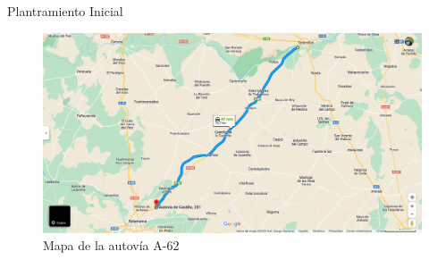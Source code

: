 Plantramiento Inicial

\begin{figure}[H]
    \centering
 	\includegraphics[width=\textwidth]{Imagenes/PlanteamientoInicial/carreteraMAPS.pdf}
    \caption{Mapa de la autovía A-62}
    \label{autovia}
\end{figure}